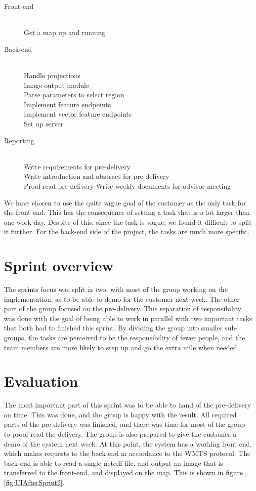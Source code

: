\documentclass[11pt,a4paper,titlepage,oneside]{report}
\begin{document}
\begin{description}
	\item[Front-end] \hfill \\
	Get a map up and running
	\item[Back-end] \hfill \\
	Handle projections \hfill \\
	Image output module \hfill \\
	Parse parameters to select region \hfill \\
	Implement feature endpoints \hfill \\
	Implement vector feature endpoints \hfill \\
	Set up server
	\item[Reporting] \hfill \\ 
	Write requirements for \gls{pre-delivery} \hfill \\
	Write introduction and abstract for \gls{pre-delivery} \hfill \\
	Proof-read \gls{pre-delivery} 
	Write weekly documents for advisor meeting
\end{description}
	
We have chosen to use the quite vague goal of the customer as the only task for the front end. This has the consequence of setting a task that is a lot larger than one work day. Despite of this, since the task is vague, we found it difficult to split it further. For the \gls{back-end} side of the project, the tasks are much more specific.

\section{Sprint overview}
The sprints focus was split in two, with most of the group working on the implementation, as to be able to demo for the customer next week. The other part of the group focused on the \gls{pre-delivery}. This separation of responsibility was done with the goal of being able to work in parallel with two important tasks that both had to finished this sprint. By dividing the group into smaller sub-groups, the tasks are perceived to be the responsibility of fewer people, and the team members are more likely to step up and go the extra mile when needed. 

\section{Evaluation}
The most important part of this sprint was to be able to hand of the \gls{pre-delivery} on time. This was done, and the group is happy with the result. All required parts of the \gls{pre-delivery} was finished, and there was time for most of the group to proof read the delivery. The group is also prepared to give the customer a demo of the system next week. At this point, the system has a working front end, which makes requests to the back end in accordance to the \gls{WMTS} \gls{protocol}. The \gls{back-end} is able to read a single \gls{netcdf} file, and output an image that is transferred to the \gls{front-end}, and displayed on the map. This is shown in figure \ref{fig:UIAfterSprint2}.
\end{document}
